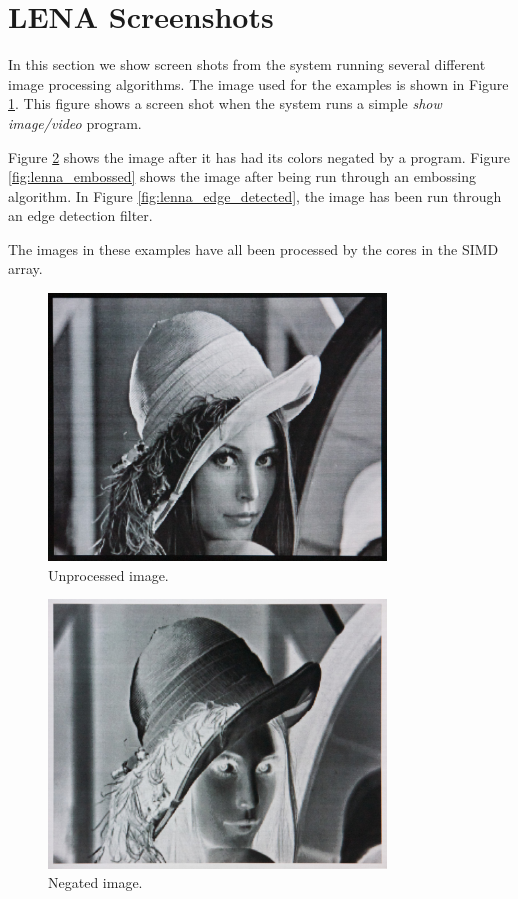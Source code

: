 \section{LENA Screenshots}

In this section we show screen shots from the system running several
different image processing algorithms. The image used for the examples
is shown in Figure \ref{fig:lenna_unprocessed}. This figure shows a
screen shot when the system runs a simple \emph{show image/video}
program.

Figure \ref{fig:lenna_negated} shows the image after it has had its
colors negated by a program. Figure \ref{fig:lenna_embossed} shows the
image after being run through an embossing algorithm. In Figure
\ref{fig:lenna_edge_detected}, the image has been run through an edge
detection filter.

The images in these examples have all been processed by the cores in the
SIMD array.

\begin{figure}[h]
  \centering
  \includegraphics[width=0.8\textwidth]{gfx/results/lenna_unprocessed}
  \caption{Unprocessed image.}
  \label{fig:lenna_unprocessed}
\end{figure}

\begin{figure}[h]
  \centering
  \includegraphics[width=0.8\textwidth]{gfx/results/lenna_negated}
  \caption{Negated image.}
  \label{fig:lenna_negated}
\end{figure}

